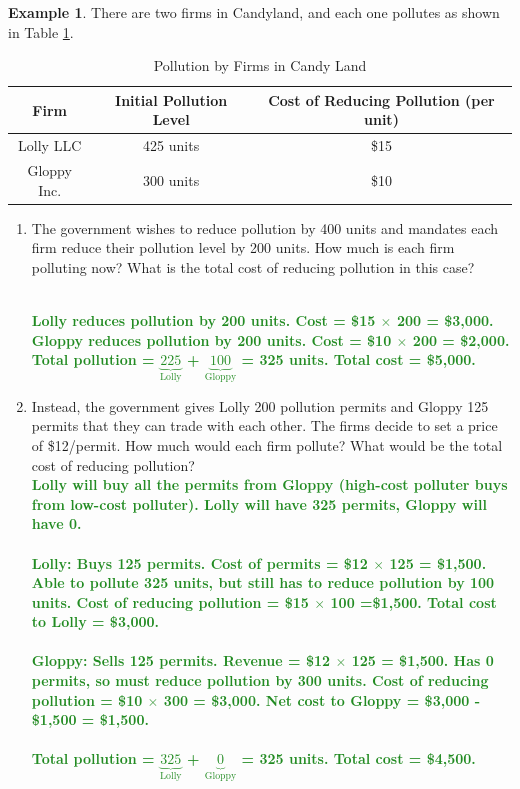 \documentclass[11pt]{article}\usepackage[]{graphicx}\usepackage[]{color}
\theoremstyle{definition}
\newtheorem{exmp}{Example}[section]
\newcommand{\blank}[1]{}
\newcommand{\ddp}[1]{{\textbf{\textcolor{ForestGreen}{#1}}}}
\begin{document}
	\begin{exmp} 
		
		There are two firms in Candyland, and each one pollutes as shown in Table \ref{pollution}.
	
	\begin{table}[H]
		\caption{Pollution by Firms in Candy Land}
		\label{pollution}
		\centering
		\begin{tabular}{ c|c|c}        
			
			Firm   & Initial Pollution Level  & Cost of Reducing Pollution (per unit)\\
			\hline
			Lolly LLC & 425 units & \$15 \\
			Gloppy Inc. & 300 units & \$10 \\
		\end{tabular}
	\end{table} 
	
	
	\begin{enumerate}
		\item The government wishes to reduce pollution by 400 units and mandates each firm reduce their pollution level by 200 units. How much is each firm polluting now? What is the total cost of reducing pollution in this case?
		\blank{}
		\blank{}
		\ddp{\\ Lolly reduces pollution by 200 units. Cost = \$15 $\times$ 200 = \$3,000. \\
			Gloppy reduces pollution by 200 units. Cost = \$10 $\times$ 200 = \$2,000. \\
			Total pollution = $\underbrace{225}_{\text{Lolly}}$ + $\underbrace{100}_{\text{Gloppy}}$ = 325 units. Total cost = \$5,000.}
		\item Instead, the government gives Lolly 200 pollution permits and Gloppy 125 permits that they can trade with each other. The firms decide to set a price of \$12/permit. How much would each firm pollute? What would be the total cost of reducing pollution?
		\ddp{\\ Lolly will buy all the permits from Gloppy (high-cost polluter buys from low-cost polluter). Lolly will have 325 permits, Gloppy will have 0. \\\\	
			Lolly: Buys 125 permits. Cost of permits = \$12 $\times$ 125 = \$1,500. Able to pollute 325 units, but still has to reduce pollution by 100 units. Cost of reducing pollution = \$15 $\times$  100 =\$1,500. Total cost to Lolly = \$3,000. \\\\
			Gloppy: Sells 125 permits. Revenue = \$12 $\times$ 125 = \$1,500. Has 0 permits, so must reduce pollution by 300 units. Cost of reducing pollution = \$10 $\times$ 300 = \$3,000. Net cost to Gloppy = \$3,000 - \$1,500 = \$1,500. \\\\
			Total pollution = $\underbrace{325}_{\text{Lolly}}$ + $\underbrace{0}_{\text{Gloppy}}$ = 325 units. Total cost = \$4,500.}
	\end{enumerate}
	\blank{}
	\blank{}
	

\end{exmp}
\end{document}
